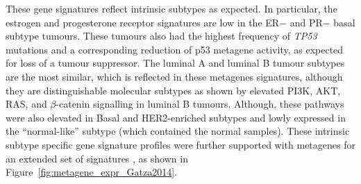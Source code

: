 \begin{figure}[!htp]
\noindent{} %
\end{figure}

These gene signatures reflect intrinsic subtypes as expected. In particular, the estrogen and progesterone receptor signatures are low in the ER$-$ and PR$-$ basal subtype tumours. These tumours also had the highest frequency of \textit{TP53} mutations and a corresponding reduction of p53 metagene activity, as expected for loss of a tumour suppressor. The luminal A and luminal B tumour subtypes are the most similar, which is reflected in these metagenes signatures, although they are distinguishable molecular subtypes as shown by elevated PI3K, AKT, RAS, and $\beta$-catenin signalling in luminal B tumours. Although, these pathways were also elevated in Basal and HER2-enriched subtypes and lowly expressed in the ``normal-like'' subtype (which contained the normal samples). These intrinsic subtype specific gene signature profiles were further supported with metagenes for an extended set of signatures \citep{Gatza2014}, as shown in Figure~\ref{fig:metagene_expr_Gatza2014}.

